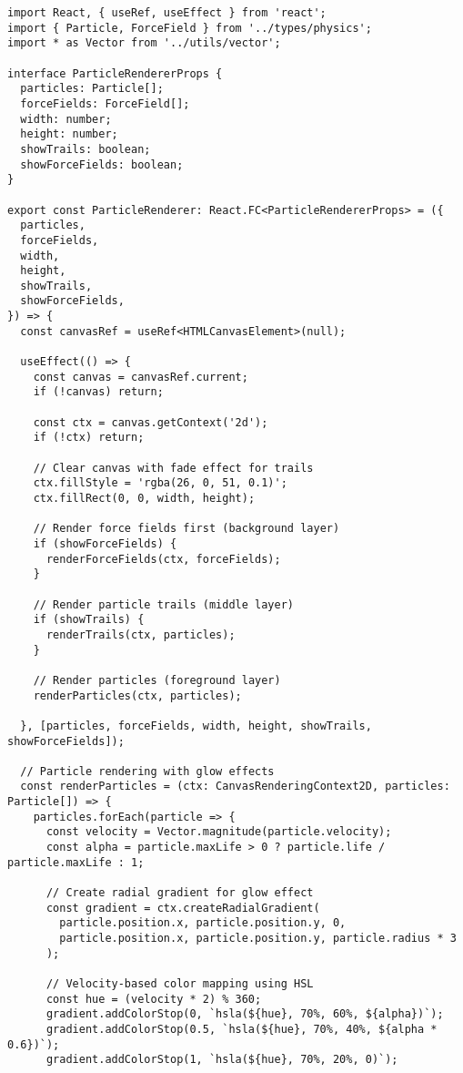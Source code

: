 \documentclass[12pt,journal,onecolumn]{IEEEtran}
\begin{document}
\begin{verbatim}
import React, { useRef, useEffect } from 'react';
import { Particle, ForceField } from '../types/physics';
import * as Vector from '../utils/vector';

interface ParticleRendererProps {
  particles: Particle[];
  forceFields: ForceField[];
  width: number;
  height: number;
  showTrails: boolean;
  showForceFields: boolean;
}

export const ParticleRenderer: React.FC<ParticleRendererProps> = ({
  particles,
  forceFields,
  width,
  height,
  showTrails,
  showForceFields,
}) => {
  const canvasRef = useRef<HTMLCanvasElement>(null);

  useEffect(() => {
    const canvas = canvasRef.current;
    if (!canvas) return;

    const ctx = canvas.getContext('2d');
    if (!ctx) return;

    // Clear canvas with fade effect for trails
    ctx.fillStyle = 'rgba(26, 0, 51, 0.1)';
    ctx.fillRect(0, 0, width, height);

    // Render force fields first (background layer)
    if (showForceFields) {
      renderForceFields(ctx, forceFields);
    }

    // Render particle trails (middle layer)
    if (showTrails) {
      renderTrails(ctx, particles);
    }

    // Render particles (foreground layer)
    renderParticles(ctx, particles);

  }, [particles, forceFields, width, height, showTrails, showForceFields]);

  // Particle rendering with glow effects
  const renderParticles = (ctx: CanvasRenderingContext2D, particles: Particle[]) => {
    particles.forEach(particle => {
      const velocity = Vector.magnitude(particle.velocity);
      const alpha = particle.maxLife > 0 ? particle.life / particle.maxLife : 1;
      
      // Create radial gradient for glow effect
      const gradient = ctx.createRadialGradient(
        particle.position.x, particle.position.y, 0,
        particle.position.x, particle.position.y, particle.radius * 3
      );
      
      // Velocity-based color mapping using HSL
      const hue = (velocity * 2) % 360;
      gradient.addColorStop(0, `hsla(${hue}, 70%, 60%, ${alpha})`);
      gradient.addColorStop(0.5, `hsla(${hue}, 70%, 40%, ${alpha * 0.6})`);
      gradient.addColorStop(1, `hsla(${hue}, 70%, 20%, 0)`);
      

\end{verbatim}
\end{document}
